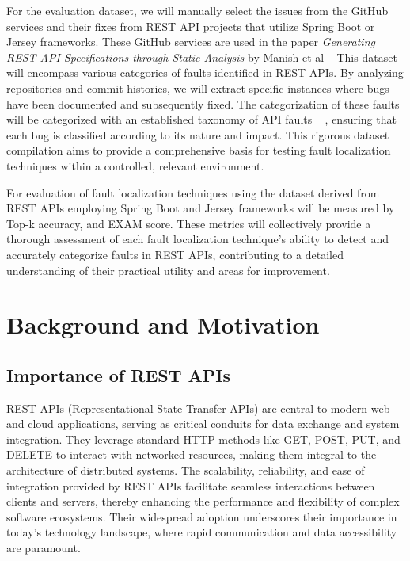 \documentclass[conference]{IEEEtran}
\newcommand{\todo}[1]{\textcolor{red}{{\bfseries [[#1]]}}}
\begin{document}
For the evaluation dataset, we will manually select the issues from the GitHub services and their fixes from REST API projects that utilize Spring Boot or Jersey frameworks. These GitHub services are used in the paper  \textit{Generating REST API Specifications through Static Analysis} by Manish et al ~\cite{ManishRestServices}
This dataset will encompass various categories of faults identified in REST APIs. By analyzing repositories and commit histories, we will extract specific instances where bugs have been documented and subsequently fixed. 
The categorization of these faults will be categorized with an established taxonomy of API faults ~\cite{automatedTestTaxonomy} , ensuring that each bug is classified according to its nature and impact. This rigorous dataset compilation aims to provide a comprehensive basis for testing fault localization techniques within a controlled, relevant environment.

For evaluation of fault localization techniques using the dataset derived from REST APIs employing Spring Boot and Jersey frameworks will be measured by Top-k accuracy, and EXAM score.
These metrics will collectively provide a thorough assessment of each fault localization technique's ability to detect and accurately categorize faults in REST APIs, contributing to a detailed understanding of their practical utility and areas for improvement.



\section{Background and Motivation}
\label{sec:background-and-motivation}

\subsection{Importance of REST APIs}

REST APIs (Representational State Transfer APIs) are central to modern web and cloud applications, serving as critical conduits for data exchange and system integration. 
They leverage standard HTTP methods like GET, POST, PUT, and DELETE to interact with networked resources, making them integral to the architecture of distributed systems. 
The scalability, reliability, and ease of integration provided by REST APIs facilitate seamless interactions between clients and servers, thereby enhancing the performance and flexibility of complex software ecosystems. 
Their widespread adoption underscores their importance in today's technology landscape, where rapid communication and data accessibility are paramount.
\end{document}
